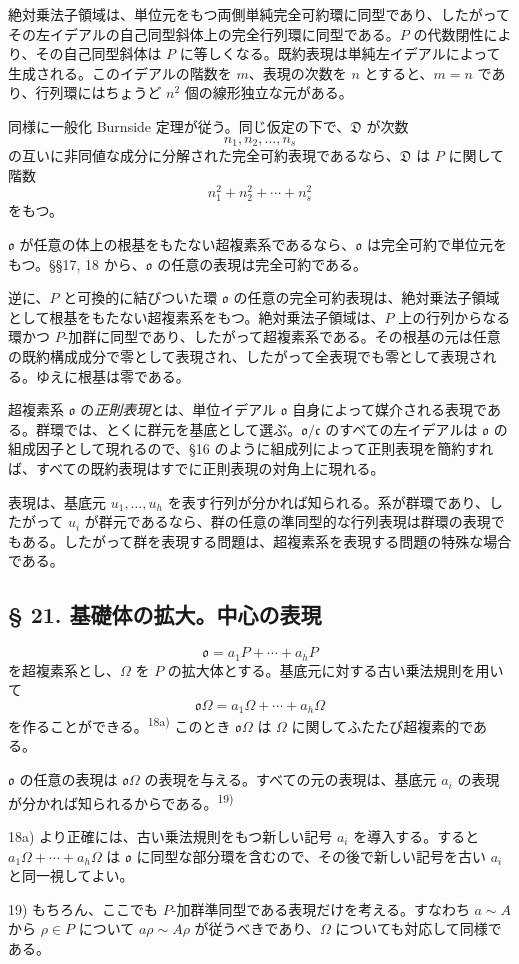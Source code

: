 \documentclass[11pt]{article}
\providecommand{\mo}{\mathfrak{o}}
\providecommand{\mc}{\mathfrak{c}}
\begin{document}
絶対乗法子領域は、単位元をもつ両側単純完全可約環に同型であり、したがってその左イデアルの自己同型斜体上の完全行列環に同型である。$P$ の代数閉性により、その自己同型斜体は $P$ に等しくなる。既約表現は単純左イデアルによって生成される。このイデアルの階数を $m$、表現の次数を $n$ とすると、$m=n$ であり、行列環にはちょうど $n^2$ 個の線形独立な元がある。

同様に一般化 Burnside 定理が従う。同じ仮定の下で、$\mathfrak D$ が次数
\[
        n_1,n_2,\ldots,n_s
\]
の互いに非同値な成分に分解された完全可約表現であるなら、$\mathfrak D$ は $P$ に関して階数
\[
        n_1^2+n_2^2+\cdots+n_s^2
\]
をもつ。

$\mo$ が任意の体上の根基をもたない超複素系であるなら、$\mo$ は完全可約で単位元をもつ。§§17, 18 から、$\mo$ の任意の表現は完全可約である。

逆に、$P$ と可換的に結びついた環 $\mo$ の任意の完全可約表現は、絶対乗法子領域として根基をもたない超複素系をもつ。絶対乗法子領域は、$P$ 上の行列からなる環かつ $P$-加群に同型であり、したがって超複素系である。その根基の元は任意の既約構成成分で零として表現され、したがって全表現でも零として表現される。ゆえに根基は零である。

超複素系 $\mo$ の\emph{正則表現}とは、単位イデアル $\mo$ 自身によって媒介される表現である。群環では、とくに群元を基底として選ぶ。$\mo/\mc$ のすべての左イデアルは $\mo$ の組成因子として現れるので、§16 のように組成列によって正則表現を簡約すれば、すべての既約表現はすでに正則表現の対角上に現れる。

表現は、基底元 $u_1,\ldots,u_h$ を表す行列が分かれば知られる。系が群環であり、したがって $u_i$ が群元であるなら、群の任意の準同型的な行列表現は群環の表現でもある。したがって群を表現する問題は、超複素系を表現する問題の特殊な場合である。

\subsection*{§ 21. 基礎体の拡大。中心の表現}

\[
        \mo=a_1P+\cdots+a_hP
\]
を超複素系とし、$\Omega$ を $P$ の拡大体とする。基底元に対する古い乗法規則を用いて
\[
        \mo\Omega=a_1\Omega+\cdots+a_h\Omega
\]
を作ることができる。\textsuperscript{18a)} このとき $\mo\Omega$ は $\Omega$ に関してふたたび超複素的である。

$\mo$ の任意の表現は $\mo\Omega$ の表現を与える。すべての元の表現は、基底元 $a_i$ の表現が分かれば知られるからである。\textsuperscript{19)}

{\footnotesize\noindent 18a) より正確には、古い乗法規則をもつ新しい記号 $a_i$ を導入する。すると $a_1\Omega+\cdots+a_h\Omega$ は $\mo$ に同型な部分環を含むので、その後で新しい記号を古い $a_i$ と同一視してよい。\par
19) もちろん、ここでも $P$-加群準同型である表現だけを考える。すなわち $a\sim A$ から $\rho\in P$ について $a\rho\sim A\rho$ が従うべきであり、$\Omega$ についても対応して同様である。\par}
\end{document}
